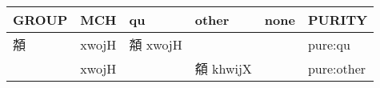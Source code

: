 \documentclass[14pt,a4paper]{scrartcl}
\begin{document}
\begin{longtable}[c]{@{}llllll@{}}
\toprule
\begin{minipage}[b]{0.14\columnwidth}\raggedright\strut
GROUP
\strut\end{minipage} &
\begin{minipage}[b]{0.14\columnwidth}\raggedright\strut
MCH
\strut\end{minipage} &
\begin{minipage}[b]{0.14\columnwidth}\raggedright\strut
qu
\strut\end{minipage} &
\begin{minipage}[b]{0.14\columnwidth}\raggedright\strut
other
\strut\end{minipage} &
\begin{minipage}[b]{0.14\columnwidth}\raggedright\strut
none
\strut\end{minipage} &
\begin{minipage}[b]{0.14\columnwidth}\raggedright\strut
PURITY
\strut\end{minipage}\tabularnewline
\midrule
\endhead
\begin{minipage}[t]{0.14\columnwidth}\raggedright\strut
頮
\strut\end{minipage} &
\begin{minipage}[t]{0.14\columnwidth}\raggedright\strut
xwojH
\strut\end{minipage} &
\begin{minipage}[t]{0.14\columnwidth}\raggedright\strut
頮 xwojH
\strut\end{minipage} &
\begin{minipage}[t]{0.14\columnwidth}\raggedright\strut
\strut\end{minipage} &
\begin{minipage}[t]{0.14\columnwidth}\raggedright\strut
\strut\end{minipage} &
\begin{minipage}[t]{0.14\columnwidth}\raggedright\strut
pure:qu
\strut\end{minipage}\tabularnewline
\begin{minipage}[t]{0.14\columnwidth}\raggedright\strut
𢌳
\strut\end{minipage} &
\begin{minipage}[t]{0.14\columnwidth}\raggedright\strut
xwojH
\strut\end{minipage} &
\begin{minipage}[t]{0.14\columnwidth}\raggedright\strut
\strut\end{minipage} &
\begin{minipage}[t]{0.14\columnwidth}\raggedright\strut
頯 khwijX
\strut\end{minipage} &
\begin{minipage}[t]{0.14\columnwidth}\raggedright\strut
\strut\end{minipage} &
\begin{minipage}[t]{0.14\columnwidth}\raggedright\strut
pure:other
\strut\end{minipage}\tabularnewline
\bottomrule
\end{longtable}
\end{document}

